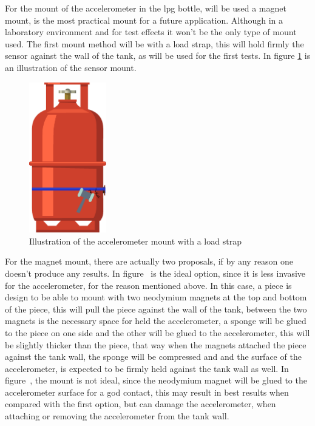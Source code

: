 For the mount of the accelerometer in the \acrshort{lpg} bottle, will be used a magnet mount, is the most practical mount for a future application. Although in a laboratory environment and for test effects it won't be the only type of mount used. The first mount method will be with a load strap, this will hold firmly the sensor against the wall of the tank, as will be used for the first tests. In figure \ref{fig:mounLoadStrap} is an illustration of the sensor mount.
\begin{figure}[]
    \centering
    \includegraphics[width=0.3\textwidth]{Chapters/4CHP/Figures/AccLoadStrap.eps}
    \caption{Illustration of the accelerometer mount with a load strap}
    \label{fig:mounLoadStrap}
\end{figure}
For the magnet mount, there are actually two proposals, if by any reason one doesn't produce any results. In figure~ is the ideal option, since it is less invasive for the accelerometer, for the reason mentioned above. In this case, a piece is design to be able to mount with two neodymium magnets at the top and bottom of the piece, this will pull the piece against the wall of the tank, between the two magnets is the necessary space for held the accelerometer, a sponge will be glued to the piece on one side and the other will be glued to the accelerometer, this will be slightly thicker than the piece, that way when the magnets attached the piece against the tank wall, the sponge will be compressed and and the surface of the accelerometer, is expected to be firmly held against the tank wall as well. In figure~, the mount is not ideal, since the neodymium magnet will be glued to the accelerometer surface for a god contact, this may result in best results when compared with the first option, but can damage the accelerometer, when attaching or removing the accelerometer from the tank wall.
